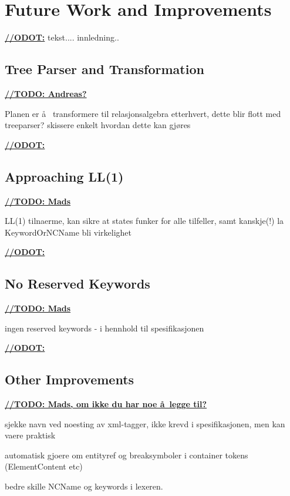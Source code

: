 \chapter{Future Work and Improvements}
\label{sect:summary:future_work}
\underline{\textbf{\LARGE //ODOT:}} tekst.... innledning..


\section{Tree Parser and Transformation}
\underline{\textbf{\LARGE //TODO: Andreas?}}

Planen er \aa~ transformere til relasjonsalgebra etterhvert, dette blir flott med treeparser? skissere enkelt hvordan dette kan gj\o res

\underline{\textbf{\LARGE //ODOT:}}

\section{Approaching LL(1)}

\underline{\textbf{\LARGE //TODO: Mads}}

LL(1) tilnaerme, kan sikre at states funker for alle tilfeller, samt kanskje(!) la KeywordOrNCName bli virkelighet

\underline{\textbf{\LARGE //ODOT:}}

\section{No Reserved Keywords}

\underline{\textbf{\LARGE //TODO: Mads}}

ingen reserved keywords - i hennhold til spesifikasjonen

\underline{\textbf{\LARGE //ODOT:}}

\section{Other Improvements}

\underline{\textbf{\LARGE //TODO: Mads, om ikke du har noe \aa~legge til?}}

sjekke navn ved noesting av xml-tagger, ikke krevd i spesifikasjonen, men kan vaere praktisk

automatisk gjoere om entityref og breaksymboler i container tokens (ElementContent etc)

bedre skille NCName og keywords i lexeren.

